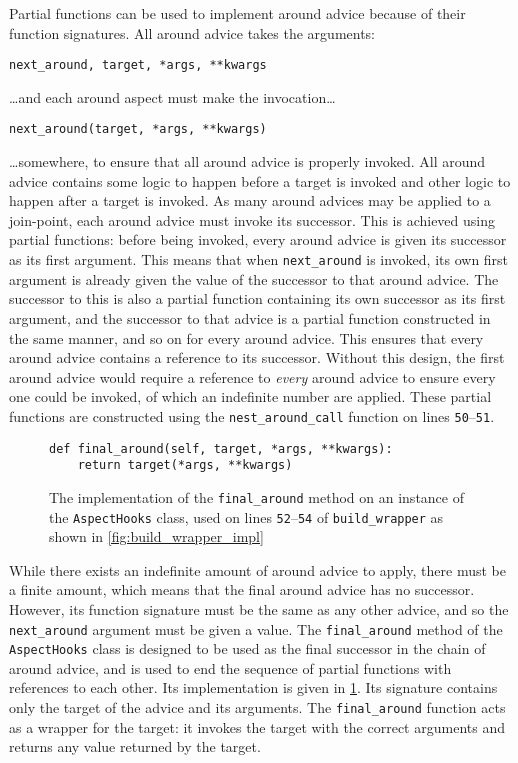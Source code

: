 Partial functions can be used to implement around advice because of their
function signatures. All around advice takes the arguments:

{\centering

\lstinline{next_around, target, *args, **kwargs}

}

\ldots{}and each around aspect must make the invocation\ldots{}

{\centering

\lstinline{next_around(target, *args, **kwargs)}

}

\ldots{}somewhere, to ensure that all around advice is properly invoked. All
around advice contains some logic to happen before a target is invoked and other
logic to happen after a target is invoked. As many around advices may be applied
to a join-point, each around advice must invoke its successor. This is achieved
using partial functions: before being invoked, every around advice is given its
successor as its first argument. This means that when \lstinline{next_around} is
invoked, its own first argument is already given the value of the successor to
that around advice. The successor to this is also a partial function containing
its own successor as its first argument, and the successor to that advice is a
partial function constructed in the same manner, and so on for every around
advice. This ensures that every around advice contains a reference to its
successor. Without this design, the first around advice would require a
reference to \emph{every} around advice to ensure every one could be invoked, of
which an indefinite number are applied. These partial functions are constructed
using the \lstinline{nest_around_call} function on lines
\texttt{50}--\texttt{51}.

\begin{figure}
    \begin{lstlisting}
def final_around(self, target, *args, **kwargs):
    return target(*args, **kwargs)
    \end{lstlisting}
    \caption{The implementation of the \lstinline{final_around} method on an
    instance of the \lstinline{AspectHooks} class, used on lines
    \texttt{52}--\texttt{54} of \lstinline{build_wrapper} as shown in \cref{fig:build_wrapper_impl}}
    \label{fig:final_around_impl}
\end{figure}


While there exists an indefinite amount of around advice to apply, there must be
a finite amount, which means that the final around advice has no successor.
However, its function signature must be the same as any other advice, and so the
\lstinline{next_around} argument must be given a value. The
\lstinline{final_around} method of the \lstinline{AspectHooks} class is designed
to be used as the final successor in the chain of around advice, and is used to
end the sequence of partial functions with references to each other. Its
implementation is given in \cref{fig:final_around_impl}. Its
signature contains only the target of the advice and its arguments. The
\lstinline{final_around} function acts as a wrapper for the target: it invokes
the target with the correct arguments and returns any value returned by the
target. 


